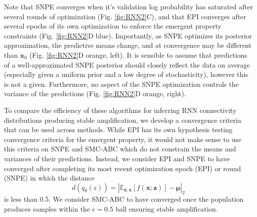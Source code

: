 \documentclass[11pt]{article}
\begin{document}
Note that SNPE converges when it's validation log probability has saturated after several rounds of optimization (Fig. \ref{fig:RNN2}C), and that EPI converges after several epochs of its own optimization to enforce the emergent property constraints (Fig. \ref{fig:RNN2}D blue).
Importantly, as SNPE optimizes its posterior approximation, the predictive means change, and at convergence may be different than $\mathbf{x}_0$ (Fig. \ref{fig:RNN2}D orange, left).
It is sensible to assume that predictions of a well-approximated SNPE posterior should closely reflect the data on average (especially given a uniform prior and a low degree of stochasticity), however this is not a given.
Furthermore, no aspect of the SNPE optimization controls the variance of the predictions (Fig. \ref{fig:RNN2}D orange, right).

To compare the efficiency of these algorithms for inferring RNN connectivity distributions producing stable amplification, we develop a convergence criteria that can be used across methods.
While EPI has its own hypothesis testing convergence criteria for the emergent property, it would not make sense to use this criteria on SNPE and SMC-ABC which do not constrain the means and variances of their predictions.
Instead, we consider EPI and SNPE to have converged after completing its most recent optimization epoch (EPI) or round (SNPE) in which the distance
\begin{equation}
d(q_\theta(z)) = |\mathbb{E}_{\mathbf{z}, \mathbf{x}} \left[f(\mathbf{x}; \mathbf{z}) \right] - \bm{\mu}|_2
\end{equation}
is less than 0.5.
We consider SMC-ABC to have converged once the population produces samples within the $\epsilon = 0.5$ ball ensuring stable amplification.
\end{document}
